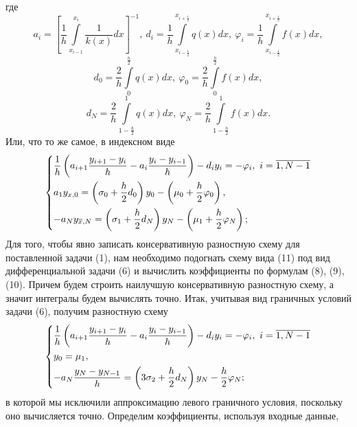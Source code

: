 \documentclass[a4paper, 12pt]{article}
\begin{document}
    где 
    \begin{equation}
    	a_i = \left[ \dfrac 1h \int\limits_{x_{i-1}}^{x_i} \dfrac{1}{k(x)}dx\right]^{-1},\
    	d_i =\dfrac 1h \int\limits_{x_{i-\frac12}}^{x_{i+\frac12}} q(x) dx,\
    	\varphi_i = \dfrac{1}{h} \int\limits_{x_{i-\frac12}}^{x_{i+\frac12}}f(x)dx,
    \end{equation}
    \begin{equation}
    	d_0 = \dfrac2h \int\limits_0^{\frac h2}q(x)dx,\ \varphi_0 = \dfrac 2h \int\limits_0^{\frac h2}f(x)dx,
    \end{equation}
    \begin{equation}
    	d_N = \dfrac2h \int\limits_{1-\frac h2}^1 q(x)dx,\ \varphi_N = \dfrac 2h \int\limits_{1-\frac h2}^1f(x)dx.
    \end{equation}
    Или, что то же самое, в индексном виде
    \begin{equation}
    	\begin{dcases}
    		\dfrac{1}{h}\left(a_{i+1}\dfrac{y_{i+1} - y_i}{h} - a_i \dfrac{y_i - y_{i-1}}{h}\right)-d_iy_i = -\varphi_i,\ i=\overline {1,N-1}\\
    		a_1 y_{x,0} = \left(\sigma_0 + \dfrac h2 d_0\right)y_0 - \left(\mu_0 + \dfrac h2 \varphi_0\right),\\
    		-a_N y_{\overline x, N} = \left(\sigma_1 + \dfrac h2 d_N\right)y_N - \left(\mu_1 + \dfrac h2 \varphi_N\right);
    	\end{dcases}
    \end{equation}
    Для того, чтобы явно записать консервативную разностную схему для поставленной задачи (1), нам необходимо подогнать схему вида (11) под вид дифференциальной задачи (6) и вычислить коэффициенты по формулам (8), (9), (10). Причем будем строить наилучшую консервативную разностную схему, а значит интегралы будем вычислять точно.
    Итак, учитывая вид граничных условий задачи (6), получим разностную схему
    \begin{equation}
    	\begin{dcases}
    		\dfrac{1}{h}\left(a_{i+1}\dfrac{y_{i+1} - y_i}{h} - a_i \dfrac{y_i - y_{i-1}}{h}\right)-d_iy_i = -\varphi_i,\ i=\overline {1,N-1}\\
    		y_0 = \mu_1,\\
    		-a_N \dfrac{y_N - y_{N-1}}{h} = \left(3\sigma_2 + \dfrac h2 d_N\right)y_N - \dfrac h2 \varphi_N;
    	\end{dcases}
    \end{equation}
    в которой мы исключили аппроксимацию левого граничного условия, поскольку оно вычисляется точно. Определим коэффициенты, используя входные данные, 
\end{document}
